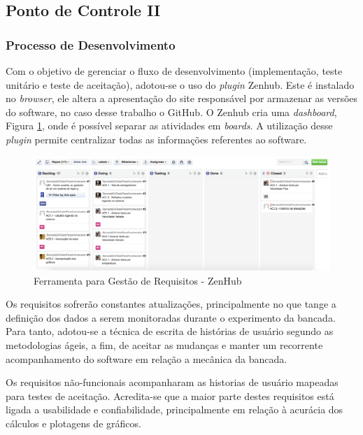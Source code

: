 \subsection{Ponto de Controle II}
\subsubsection{Processo de Desenvolvimento}

	Com o objetivo de gerenciar o fluxo de desenvolvimento (implementação, teste unitário e teste de aceitação), adotou-se o uso do \textit{plugin} Zenhub. Este é instalado no \textit{browser}, ele altera a apresentação do site responsável por armazenar as versões do software, no caso desse trabalho o GitHub. O Zenhub cria uma \textit{dashboard}, Figura \ref{img:zenHub},  onde é possível separar as atividades em \textit{boards}. A utilização desse \textit{plugin} permite centralizar todas as informações referentes ao software.

	\begin{figure}[h]
		\centering
		\includegraphics[width=1\textwidth]{resource/zenHub.png}
		\caption{Ferramenta para Gestão de Requisitos - ZenHub}
		\label{img:zenHub}
	\end{figure}



	Os requisitos sofrerão constantes atualizações, principalmente no que tange a definição dos dados a serem monitoradas durante o experimento da bancada. Para tanto, adotou-se a técnica de escrita de histórias de usuário segundo as metodologias ágeis, a fim, de aceitar as mudanças e manter um recorrente acompanhamento do software em relação a mecânica da bancada.

	Os requisitos não-funcionais acompanharam as historias de usuário mapeadas para testes de aceitação. Acredita-se que a maior parte destes requisitos está ligada a usabilidade e confiabilidade, principalmente em relação à acurácia dos cálculos e plotagens de gráficos.

